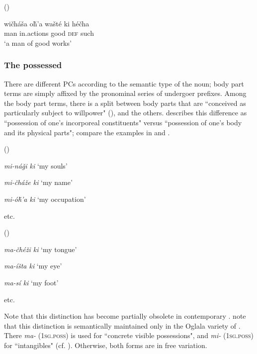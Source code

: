\documentclass[output=paper]{LSP/langsci}
\begin{document}
\ea {} (\citealt[93]{Buechel1939}) \label{lakotagoodworks}

\gll wi\v{c}háša o\v{h}'a     wašté ki     hé\v{c}ha \\
man       in.actions good  \textsc{def} such \\
\glt `a man of good works'
\z

\subsubsection{The possessed}
There are different PCs according to the semantic type of the  noun; body part terms are simply affixed by the pronominal series of undergoer prefixes. Among the body part terms, there is a split between body parts that are ``conceived as particularly subject to willpower" (\citealt[128]{BoasDeloria1941}), and the others. \citet[100]{Buechel1939} describes this difference as ``possession of one's incorporeal constituents" versus ``possession of one's body and its physical parts"; compare the examples in  and .

\ea {} (\citealt[101]{Buechel1939}) \label{lakotaincorporeal}

\textit{mi-ná\v{g}i ki } \hspace{2.1em}		`my souls'

\textit{mi-\v{c}há\v{z}e  ki } \hspace{1.9em} `my name'

\textit{mi-ó\v{h}'a ki}	\hspace{2em}		`my occupation'

etc.

\ex {} (\citealt[100]{Buechel1939}) \label{lakotabody}

\textit{ma-\v{c}hé\v{z}i ki } \hspace{1.7em}	`my tongue'

\textit{ma-íšta ki }	 \hspace{2.1em}	`my eye'

\textit{ma-sí ki }		 \hspace{3em}	`my foot'

etc.
\z

Note that this distinction has become partially obsolete in contemporary . \citet[458]{RoodTaylor1996} note that this distinction is semantically maintained only in the Oglala variety of . There \textit{ma-} (\textsc{1sg.poss}) is used for ``concrete visible possessions", and \textit{mi-} (\textsc{1sg.poss}) for ``intangibles" (cf. \citealt[458]{RoodTaylor1996}). Otherwise, both forms are in free variation.
\end{document}
